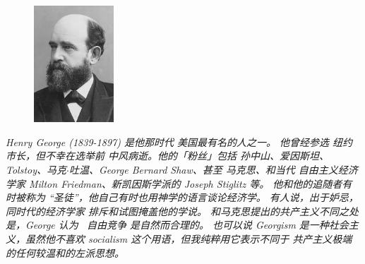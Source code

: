 \begin{preview}
\begin{minipage}{\textwidth}

\begin{figure}		%
	\label{wrap-fig:1}
	\vspace{-0.5cm}
	\includegraphics[width=3cm]{Henry-George.jpg}
\end{figure}
\textit{Henry George (1839-1897) 是他那时代 美国最有名的人之一。 他曾经参选 纽约 市长，但不幸在选举前 中风病逝。他的「粉丝」包括 孙中山、爱因斯坦、Tolstoy、马克$\cdot$吐温、George Bernard Shaw、甚至 马克思、和当代 自由主义经济学家 Milton Friedman、新凯因斯学派的 Joseph Stiglitz 等。 他和他的追随者有时被称为 “圣徒”，他自己有时也用神学的语言谈论经济学。 有人说，出于妒忌，同时代的经济学家 排斥和试图掩盖他的学说。 和马克思提出的共产主义不同之处是，George 认为 {\color{blue}\ 自由竞争} 是自然而合理的。 也可以说 Georgism 是一种社会主义，虽然他不喜欢 socialism 这个用语，但我纯粹用它表示不同于 共产主义极端 的任何较温和的左派思想。} \\

\section{}


\end{minipage}
\end{preview}
